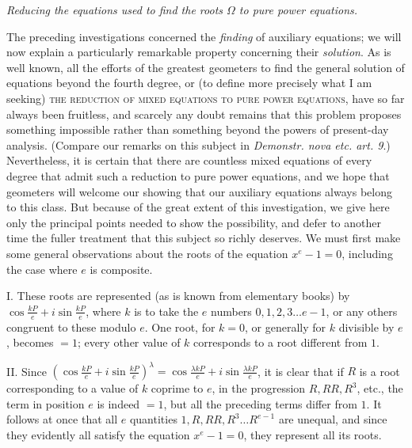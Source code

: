 \begin{center}\itshape \textit{Reducing the equations used to find the roots \(\Omega\) to pure power equations.}\end{center}


The preceding investigations concerned the \textit{finding} of auxiliary equations; we will now explain a particularly remarkable property concerning their \textit{solution}. As is well known, all the efforts of the greatest geometers to find the general solution of equations beyond the fourth degree, or (to define more precisely what I am seeking) \textsc{the reduction of mixed equations to pure power equations}, have so far always been fruitless, and scarcely any doubt remains that this problem proposes something impossible rather than something beyond the powers of present-day analysis. (Compare our remarks on this subject in \textit{Demonstr. nova etc. art. 9}.) Nevertheless, it is certain that there are countless mixed equations of every degree that admit such a reduction to pure power equations, and we hope that geometers will welcome our showing that our auxiliary equations always belong to this class. But because of the great extent of this investigation,
we give here only the principal points needed to show the possibility, and defer to another time the fuller treatment that this subject so richly deserves. We must first make some general observations about the roots of the equation \(x^e-1=0\), including the case where \(e\) is composite.

I. These roots are represented (as is known from elementary books) by \(\cos\frac{kP}e+i\sin\frac{kP}e\), where \(k\) is to take the \(e\) numbers \(0,\allowbreak 1,\allowbreak 2,\allowbreak 3\ldots e-1\), or any others congruent to these modulo \(e\). One root, for \(k=0\), or generally for \(k\) divisible by \(e\), becomes \(=1\); every other value of \(k\) corresponds to a root different from \(1\).

II. Since \((\cos\frac{kP}e+i\sin\frac{kP}e)^\lambda=\cos\frac{\lambda kP}e+i\sin\frac{\lambda kP}e\), it is clear that if \(R\) is a root corresponding to a value of \(k\) coprime to \(e\), in the progression \(R,\allowbreak RR,\allowbreak R^3\), etc., the term in position \(e\) is indeed \(=1\), but all the preceding terms differ from \(1\). It follows at once that all \(e\) quantities \(1,\allowbreak R,\allowbreak RR,\allowbreak R^3\ldots R^{e-1}\) are unequal, and since they evidently all satisfy the equation \(x^e-1=0\), they represent all its roots.

